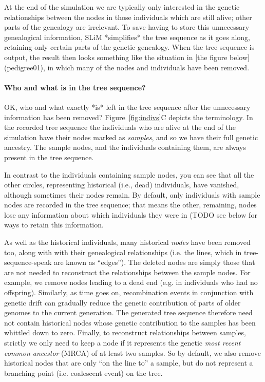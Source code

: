 \documentclass[12pt]{article}
\begin{document}
At the end of the simulation we are typically only interested in the genetic
relationships between the nodes in those individuals which are still alive;
other parts of the genealogy are irrelevant. To save having to store this unnecessary
genealogical information, SLiM *simplifies* the tree sequence as it goes along, retaining
only certain parts of the genetic genealogy. When the tree sequence is output, the result
then looks something like the situation in [the figure below](pedigree01), in which many of the nodes and
individuals have been removed.

\paragraph{Who and what is in the tree sequence?}

OK, who and what exactly *is* left in the tree sequence after the unnecessary
information has been removed?
Figure~\ref{fig:indivs}C depicts the terminology.
In the recorded tree sequence the individuals who are alive at the end of the simulation
have their nodes marked as \textit{samples},
and so we have their full genetic ancestry.
The sample nodes,
and the individuals containing them, are always present in the tree sequence.

In contrast to the individuals containing sample nodes, you can see that all the other
circles, representing historical (i.e., dead) individuals, have vanished, although
sometimes their nodes remain. By default, only individuals with sample nodes are recorded
in the tree sequence; that means the other, remaining, nodes lose any information about
which individuals they were in (TODO see below for ways to retain this information.

As well as the historical individuals, many historical \textit{nodes}  have been removed too,
along with with their genealogical relationships (i.e. the lines, which in
tree-sequence-speak are known as ``edges''). The deleted nodes are simply those that are
not needed to reconstruct the relationships between the sample nodes. For example, we
remove nodes leading to a dead end (e.g. in individuals who had no offspring). Similarly,
as time goes on, recombination events in conjunction with genetic drift can gradually
reduce the genetic contribution of parts of older genomes to the current generation.
The generated tree sequence therefore need not contain historical nodes whose genetic
contribution to the samples has been whittled down to zero. Finally, to
reconstruct relationships between samples, strictly we only need to keep a node if it
represents the genetic \textit{most recent common ancestor} (MRCA) of at least two samples. So
by default, we also remove historical nodes that are only ``on the line to'' a sample, but
do not represent a branching point (i.e. coalescent event) on the tree.
\end{document}
